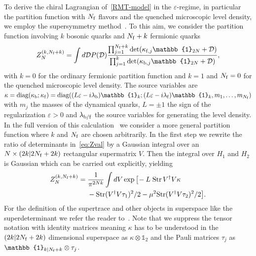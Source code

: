\documentclass[aps,prl,reprint,graphicx,showpacs]{revtex4-1}
\newcommand{\Str}{\text{Str}}
\newcommand{\id}{\mathbb{1}}
\newcommand{\diag}{\text{diag}}
\renewcommand{\epsilon}{\varepsilon}
\begin{document}
To derive the chiral Lagrangian of~\eqref{RMT-model} in the $\epsilon$-regime, in particular the partition function with $N_{\rm f}$ flavors and the quenched microscopic level density, we employ the supersymmetry method~\cite{Guhr}. To this aim, we consider the partition function involving $k$ bosonic quarks and $N_{\rm f}+k$ fermionic quarks 
\begin{equation}\label{eq:Zval}
		Z_N^{(k,N_{\rm f}+k)} = \int d\mathcal{D} P(\mathcal{D})\frac{\prod_{j=1}^{N_{\rm f}+k}\det(\kappa_{{\rm f}, j} \id_{2N}+\mathcal{D})}{\prod_{j=1}^{k}\det(\kappa_{{\rm b}, j} \id_{2N}+\mathcal{D})},
\end{equation}
with $k=0$ for the ordinary fermionic partition function and $k=1$ and $N_{\rm f}=0$ for the quenched microscopic level density. The source variables are $\kappa=\diag(\kappa_{\rm b};\kappa_{\rm f})=\diag((L\epsilon-i\lambda_{\rm b})\id_k;(L\epsilon-i\lambda_{\rm f})\id_k,m_1,\ldots,m_{N_{\rm f}})$ with $m_j$ the masses of the dynamical quarks, $L=\pm1$ the sign of the regularization $\epsilon>0$ and $\lambda_{\rm b/f}$ the source variables for generating the level density. In the full version of this calculation~\cite{Kanazawa:2018b} we consider a more general partition function where $k$ and $N_{\rm f}$ are chosen arbitrarily. In the first step we rewrite the ratio of determinants in~\eqref{eq:Zval} by a Gaussian integral over an $N\times(2k|2N_{\rm f}+2k)$ rectangular supermatrix $V$. Then the integral over $H_1$ and $H_2$ is Gaussian which can be carried out explicitly, yielding
\begin{equation}\label{susy:partiton}
\begin{split}
		Z_N^{(k,N_{\rm f}+k)} = \; &\frac{1}{\pi^{2 Nk}}\int dV 
		\exp\big[\! -L\; \Str\,V^\dagger V\kappa \\
		&-\Str  (V^\dagger V\tau_1)^2/2-\mu^2\Str (V^\dagger V\tau_2)^2/2 \big].
\end{split}
\end{equation}
For the definition of the supertrace and other objects in superspace like the superdeterminant we refer the reader to~\cite{Berezin}. Note that we suppress the tensor notation with identity matrices  meaning $\kappa$ has to be understood in the $(2k|2N_{\rm f}+2k)$ dimensional superspace as $\kappa\otimes\id_2$ and the Pauli matrices $\tau_j$ as $\id_{k|N_{\rm f}+k}\otimes\tau_j$.
\end{document}
